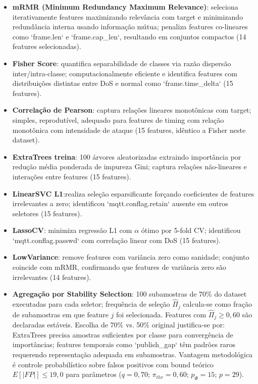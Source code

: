 \documentclass[12pt]{article}
\begin{document}
\begin{itemize}
    \item \textbf{mRMR (Minimum Redundancy Maximum Relevance)}: seleciona iterativamente features maximizando relevância com target e minimizando redundância interna usando informação mútua; penaliza features co-lineares como `frame.len` e `frame.cap\_len`, resultando em conjuntos compactos (14 features selecionadas). 
    \item  \textbf{Fisher Score}: quantifica separabilidade de classes via razão dispersão inter/intra-classe; computacionalmente eficiente e identifica features com distribuições distintas entre DoS e normal como `frame.time\_delta` (15 features).
    \item \textbf{Correlação de Pearson}: captura relações lineares monotônicas com target; simples, reprodutível, adequado para features de timing com relação monotônica com intensidade de ataque (15 features, idêntico a Fisher neste dataset).
    
    \item \textbf{ExtraTrees treina}: 100 árvores aleatorizadas extraindo importância por redução média ponderada de impureza Gini; captura relações não-lineares e interações entre features (15 features).
    
    \item  \textbf{LinearSVC L1}:realiza seleção esparsificante forçando coeficientes de features irrelevantes a zero; identificou `mqtt.conflag.retain` ausente em outros seletores (15 features).
    
    \item \textbf{LassoCV}: minimiza regressão L1 com $\alpha$ ótimo por 5-fold CV; identificou `mqtt.conflag.passwd` com correlação linear com DoS (15 features).
    
    \item \textbf{LowVariance}: remove features com variância zero como sanidade; conjunto coincide com mRMR, confirmando que features de variância zero são irrelevantes (14 features).
    
    \item \textbf{Agregação por Stability Selection}: 100 subamostras de 70\% do dataset executadas para cada seletor; frequência de seleção $\hat{\Pi}_j$ calcula-se como fração de subamostras em que feature $j$ foi selecionada. Features com $\hat{\Pi}_j \geq 0{,}60$ são declaradas estáveis. Escolha de 70\% vs. 50\% original justifica-se por: ExtraTrees precisa amostras suficientes por classe para convergência de importâncias; features temporais como `publish\_gap` têm padrões raros requerendo representação adequada em subamostras. Vantagem metodológica é controle probabilístico sobre falsos positivos com bound teórico $E[|FP|] \leq 19{,}0$ para parâmetros ($q=0{,}70$; $\pi_{thr}=0{,}60$; $p_\Phi=15$; $p=29$).
    
\end{itemize}
\end{document}
